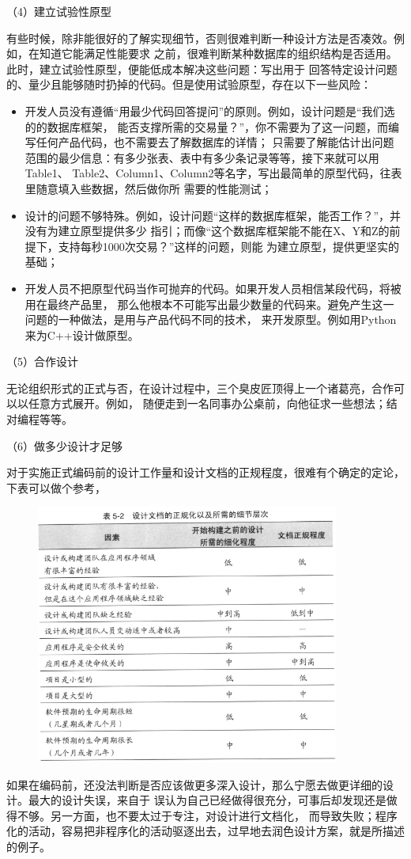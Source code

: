 \documentclass{article}
\begin{document}
\par
（4）建立试验性原型
\par
有些时候，除非能很好的了解实现细节，否则很难判断一种设计方法是否凑效。例如，在知道它能满足性能要求
之前，很难判断某种数据库的组织结构是否适用。此时，建立试验性原型，便能低成本解决这些问题：写出用于
回答特定设计问题的、量少且能够随时扔掉的代码。但是使用试验原型，存在以下一些风险：
\begin{itemize}
    \item 开发人员没有遵循“用最少代码回答提问”的原则。例如，设计问题是“我们选的的数据库框架，
    能否支撑所需的交易量？”，你不需要为了这一问题，而编写任何产品代码，也不需要去了解数据库的详情；
    只需要了解能估计出问题范围的最少信息：有多少张表、表中有多少条记录等等，接下来就可以用Table1、
    Table2、Column1、Column2等名字，写出最简单的原型代码，往表里随意填入些数据，然后做你所
    需要的性能测试；
    \item 设计的问题不够特殊。例如，设计问题“这样的数据库框架，能否工作？”，并没有为建立原型提供多少
    指引；而像“这个数据库框架能不能在X、Y和Z的前提下，支持每秒1000次交易？”这样的问题，则能
    为建立原型，提供更坚实的基础；
    \item 开发人员不把原型代码当作可抛弃的代码。如果开发人员相信某段代码，将被用在最终产品里，
    那么他根本不可能写出最少数量的代码来。避免产生这一问题的一种做法，是用与产品代码不同的技术，
    来开发原型。例如用Python来为C++设计做原型。
\end{itemize}


\par
（5）合作设计
\par
无论组织形式的正式与否，在设计过程中，三个臭皮匠顶得上一个诸葛亮，合作可以以任意方式展开。例如，
随便走到一名同事办公桌前，向他征求一些想法；结对编程等等。


\par
（6）做多少设计才足够
\par
对于实施正式编码前的设计工作量和设计文档的正规程度，很难有个确定的定论，下表可以做个参考，
\begin{figure}[ht]
    \centering
    \includegraphics[width=10cm]{figure10.png}
\end{figure}
\par
如果在编码前，还没法判断是否应该做更多深入设计，那么宁愿去做更详细的设计。最大的设计失误，来自于
误认为自己已经做得很充分，可事后却发现还是做得不够。另一方面，也不要太过于专注，对设计进行文档化，
而导致失败；程序化的活动，容易把非程序化的活动驱逐出去，过早地去润色设计方案，就是所描述的例子。
\end{document}
